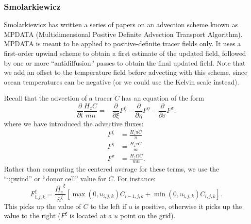\subsubsection{Smolarkiewicz}
\label{Smolark}
Smolarkiewicz has written a series of papers \citep{Smolark83,
Smolark84, Smolark86, Smolark90} on an
advection scheme known as MPDATA (Multidimensional
Positive Definite Advection Transport Algorithm).
MPDATA is meant to be applied to positive-definite tracer fields
only. It uses a first-order upwind scheme to obtain a first
estimate of the updated field, followed by one or more
``antidiffusion'' passes to obtain the final updated field.
Note that we add an offset to the temperature field before advecting
with this scheme, since ocean temperatures can be negative (or we
could use the Kelvin scale instead).

Recall that the advection of a tracer $C$ has an equation of the form
\begin{equation}
  \frac{\partial}{\partial t} \frac{ H_z C}{mn} =
  - \frac{\partial}{\partial \xi} F^\xi
  - \frac{\partial}{\partial \eta} F^\eta
  - \frac{\partial}{\partial \sigma} F^\sigma  .
\end{equation}
where we have introduced the advective fluxes:
\begin{align}
   F^\xi &= \frac{H_z u C}{n} \\
   F^\eta &= \frac{H_z v C}{m} \\
   F^\sigma &= \frac{H_z \Omega C}{mn} .
\end{align}
Rather than computing the centered average for these terms, 
we use the ``upwind'' or ``donor cell'' value for $C$. For instance:
\begin{equation}
   F^\xi_{i,j,k} = \frac{\overline{H_z}^\xi}{\overline{n}^\xi}
   \left[ \max(0,u_{i,j,k}) C_{i-1,j,k} +
   \min(0,u_{i,j,k}) C_{i,j,k} \right] .
\label{equp}
\end{equation}
This picks up the value of $C$ to the left if $u$ is positive,
otherwise it picks up the value to the right ($F^\xi$ is located at a
$u$ point on the grid).
   
